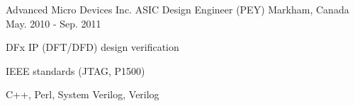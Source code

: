 \begin{cventries}
  \cventry
    {Advanced Micro Devices Inc.} %
    {ASIC Design Engineer (PEY)} %
    {Markham, Canada} %
    {May. 2010 - Sep. 2011} %
    {
      \begin{cvitems} %
        \item {DFx IP (DFT/DFD) design verification}
        \item {IEEE standards (JTAG, P1500)}
        \item {C++, Perl, System Verilog, Verilog}
      \end{cvitems}
    }

\end{cventries}

\vspace{14mm}
